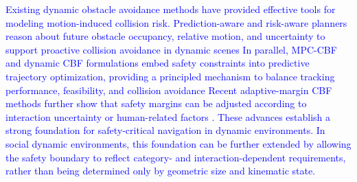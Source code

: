 \documentclass[journal]{IEEEtranTIE}
\begin{document}
\textcolor{blue}{Existing dynamic obstacle avoidance methods have provided effective tools for modeling motion-induced collision risk. Prediction-aware and risk-aware planners reason about future obstacle occupancy, relative motion, and uncertainty to support proactive collision avoidance in dynamic scenes %
In parallel, MPC-CBF and dynamic CBF formulations embed safety constraints into predictive trajectory optimization, providing a principled mechanism to balance tracking performance, feasibility, and collision avoidance %
Recent adaptive-margin CBF methods further show that safety margins can be adjusted according to interaction uncertainty or human-related factors%
. These advances establish a strong foundation for safety-critical navigation in dynamic environments. In social dynamic environments, this foundation can be further extended by allowing the safety boundary to reflect category- and interaction-dependent requirements, rather than being determined only by geometric size and kinematic state.}
\end{document}
